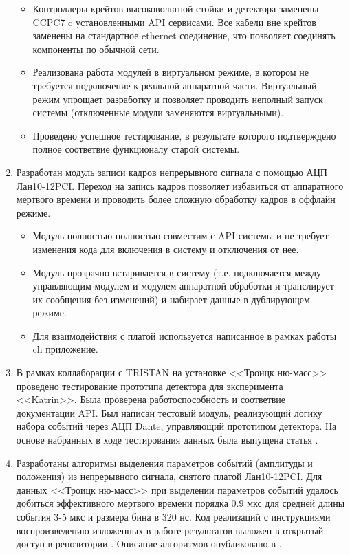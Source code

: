 \documentclass[a4paper,14pt]{extreport}
\begin{document}
\begin{enumerate}
\begin{itemize}
        \item Контроллеры крейтов высоковольтной стойки и детектора заменены CCPC7 c установленными API сервисами. Все кабели вне крейтов заменены на стандартное ethernet соединение, что позволяет соединять компоненты по обычной сети.  
        \item Реализована работа модулей в виртуальном режиме, в котором не требуется подключение к реальной аппаратной части. Виртуальный режим упрощает разработку и позволяет проводить неполный запуск системы (отключенные модули заменяются виртуальными).
        \item Проведено успешное тестирование, в результате которого подтверждено полное соответвие функционалу старой системы.
    \end{itemize}
    \item Разработан модуль записи кадров непрерывного сигнала с помощью АЦП Лан10-12PCI. Переход на запись кадров позволяет избавиться от аппаратного мертвого времени и проводить более сложную обработку кадров в оффлайн режиме. 
    \begin{itemize}
        \item Модуль полностью полностью совместим с API системы и не требует изменения кода для включения в систему и отключения от нее.
        \item Модуль прозрачно встаривается в систему (т.е. подключается между управляющим модулем и модулем аппаратной обработки и транслирует их сообщения без изменений) и набирает данные в дублирующем режиме.
       \item Для взаимодействия с платой используется написанное в рамках работы \cite{Abdurashitov2019} cli приложение.
    \end{itemize}
    \item В рамках коллаборации с TRISTAN на установке <<Троицк ню-масс>> проведено тестирование прототипа детектора для эксперимента <<Katrin>>. Была проверена работоспособность и соответвие документации API. Был написан тестовый модуль, реализующий логику набора событий через АЦП Dante, управляющий прототипом детектора. На основе набранных в ходе тестирования данных была выпущена статья \cite{1801.08182}.
    \item Разработаны алгоритмы выделения параметров событий (амплитуды и положения) из непрерывного сигнала, снятого платой Лан10-12PCI. Для данных <<Троицк ню-масс>> при выделении параметров событий удалось добиться эффективного мертвого времени порядка 0.9 мкс для средней длины события 3-5 мкс и размера бина в 320 нс. Код реализаций с инструкциями воспроизведению изложенных в работе результатов выложен в открытый доступ в репозитории \cite{signal-utils}\cite{lan10-processing}. Описание алгоритмов опубликовано в \cite{Chernov_2019}.

\end{enumerate}
\end{document}
